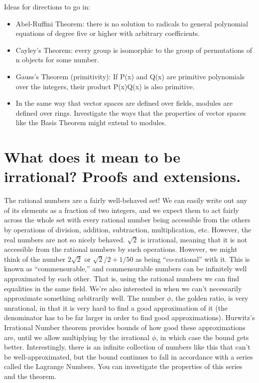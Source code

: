 \documentclass{article}
\begin{document}
    Ideas for directions to go in:
    \begin{itemize}
        \item Abel-Ruffini Theorem: there is no solution to radicals to general polynomial equations of degree five or higher with arbitrary coefficients. 
        \item Cayley's Theorem: every group is isomorphic to the group of permutations of n objects for some number.
        \item Gauss's Theorem (primitivity): If P(x) and Q(x) are primitive polynomials over the integers, their product P(x)Q(x) is also primitive.
        \item In the same way that vector spaces are defined over fields, modules are defined over rings. Investigate the ways that the properties of vector spaces like the Basis Theorem might extend to modules.
    \end{itemize}

\pagebreak

\section{What does it mean to be irrational? Proofs and extensions.}

        The rational numbers are a fairly well-behaved set!
        We can easily write out any of its elements as a fraction of two integers, and we expect them to act fairly across the whole set with every rational number being accessible from the others by operations of division, addition, subtraction, multiplication, etc.
        However, the real numbers are not so nicely behaved. $\sqrt 2$ is irrational, meaning that it is not accessible from the rational numbers by such operations.
        However, we might think of the number $2\sqrt2$ or $\sqrt2/2+1/50$ as being ``co-rational'' with it.
        This is known as ``commensurable,'' and commensurable numbers can be infinitely well approximated by each other. That is, using the rational numbers we can find equalities in the same field. We're also interested in when we can't necessarily approximate something arbitrarily well. The number $\phi$, the golden ratio, is very unrational, in that it is very hard to find a good approximation of it (the denominator has to be far larger in order to find good approximations). Hurwitz's Irrational Number theorem provides bounds of how good these approximations are, until we allow multiplying by the irrational $\phi$, in which case the bound gets better. Interestingly, there is an infinite collection of numbers like this that can't be well-approximated, but the bound continues to fall in accordance with a series called the Lagrange Numbers. You can investigate the properties of this series and the theorem.
\end{document}

